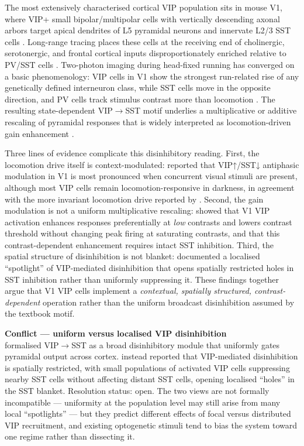 \documentclass[11pt]{article}
\let\origrightarrow\rightarrow
\def\rightarrow{\ensuremath{\origrightarrow}}
\begin{document}
The most extensively characterised cortical VIP population sits in mouse V1, where VIP+ small bipolar/multipolar cells with vertically descending axonal arbors target apical dendrites of L5 pyramidal neurons and innervate L2/3 SST cells \citep{Kawaguchi1996, Gonchar2008, Kawaguchi1997a}. Long-range tracing places these cells at the receiving end of cholinergic, serotonergic, and frontal cortical inputs disproportionately enriched relative to PV/SST cells \citep{Wall2016}. Two-photon imaging during head-fixed running has converged on a basic phenomenology: VIP cells in V1 show the strongest run-related rise of any genetically defined interneuron class, while SST cells move in the opposite direction, and PV cells track stimulus contrast more than locomotion \citep{Dipoppa2018, Pakan2016, Karnani2016b}. The resulting state-dependent VIP\rightarrow SST motif underlies a multiplicative or additive rescaling of pyramidal responses that is widely interpreted as locomotion-driven gain enhancement \citep{Pi2013, Dipoppa2018, Karnani2016b, Millman2020}.

Three lines of evidence complicate this disinhibitory reading. First, the locomotion drive itself is context-modulated: \citet{Pakan2016} reported that VIP↑/SST↓ antiphasic modulation in V1 is most pronounced when concurrent visual stimuli are present, although most VIP cells remain locomotion-responsive in darkness, in agreement with the more invariant locomotion drive reported by \citet{Dipoppa2018}. Second, the gain modulation is not a uniform multiplicative rescaling: \citet{Millman2020} showed that V1 VIP activation enhances responses preferentially at \textit{low} contrasts and lowers contrast threshold without changing peak firing at saturating contrasts, and that this contrast-dependent enhancement requires intact SST inhibition. Third, the spatial structure of disinhibition is not blanket: \citet{Karnani2016b} documented a localised ``spotlight'' of VIP-mediated disinhibition that opens spatially restricted holes in SST inhibition rather than uniformly suppressing it. These findings together argue that V1 VIP cells implement a \textit{contextual, spatially structured, contrast-dependent} operation rather than the uniform broadcast disinhibition assumed by the textbook motif.

\begin{framed}
\textbf{Conflict --- uniform versus localised VIP disinhibition}\\
\citet{Pi2013} formalised VIP\rightarrow SST as a broad disinhibitory module that uniformly gates pyramidal output across cortex. \citet{Karnani2016b} instead reported that VIP-mediated disinhibition is spatially restricted, with small populations of activated VIP cells suppressing nearby SST cells without affecting distant SST cells, opening localised ``holes'' in the SST blanket. Resolution status: open. The two views are not formally incompatible --- uniformity at the population level may still arise from many local ``spotlights'' --- but they predict different effects of focal versus distributed VIP recruitment, and existing optogenetic stimuli tend to bias the system toward one regime rather than dissecting it.
\end{framed}
\end{document}
